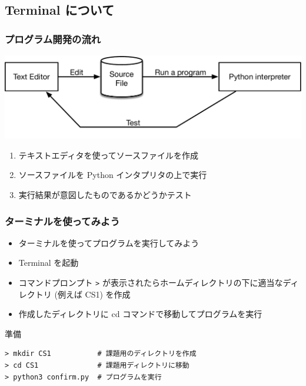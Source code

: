 %
%
\subsection{Terminal について}
\begin{frame}[containsverbatim]
\frametitle{プログラム開発の流れ}
  \begin{center}
\includegraphics[scale=0.3]{./Figure/CS-figEditAndRun.pdf}
  \end{center}
  \begin{enumerate}
\item テキストエディタを使ってソースファイルを作成
\item ソースファイルを Python インタプリタの上で実行
\item 実行結果が意図したものであるかどうかテスト
  \end{enumerate}
\end{frame}
\begin{frame}[fragile]
\frametitle{ターミナルを使ってみよう}
  \begin{itemize}
\item ターミナルを使ってプログラムを実行してみよう
\item Terminal を起動
\item コマンドプロンプト \verb|>| が表示されたらホームディレクトリの下に適当なディレクトリ (例えば CS1) を作成
\item 作成したディレクトリに cd コマンドで移動してプログラムを実行
  \end{itemize}
  \begin{itembox}{準備}
\scriptsize
    \begin{verbatim}
> mkdir CS1           # 課題用のディレクトリを作成
> cd CS1              # 課題用ディレクトリに移動
> python3 confirm.py  # プログラムを実行
    \end{verbatim}
  \end{itembox}
\end{frame}
%
%
